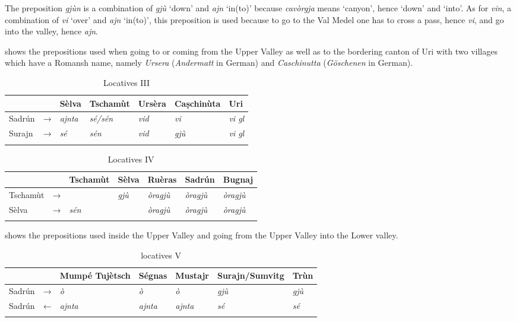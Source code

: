 The preposition \textit{gjùn} is a combination of \textit{gjù} `down' and \textit{ajn} `in(to)' because \textit{cavòrgja} means `canyon', hence `down' and `into'. As for \textit{vin}, a combination of \textit{vi} `over' and \textit{ajn} `in(to)', this preposition is used because to go to the Val Medel one has to cross a pass, hence \textit{vi}, and go into the valley, hence \textit{ajn}.

 shows the prepositions used when going to or coming from the Upper Valley as well as to the bordering canton of Uri with two villages which have a Romansh name, namely \textit{Ursera} (\textit{Andermatt} in German) and \textit{Caschinutta} (\textit{Göschenen} in German).

\begin{table}
	\caption{Locatives III}
	\label{loc3}
	\begin{tabular}{lllllll}
		\lsptoprule
		& & Sèlva & Tschamùt & Ursèra & Caṣchinùta & Uri\\ 
		\midrule
		Sadrún  & → & \textit{ajnta} & \textit{sé/sén} & \textit{vid} & \textit{vi} & \textit{vi gl}\\
		Surajn  & → & \textit{sé} & \textit{sén}  & \textit{vid} & \textit{gjù} & \textit{vi gl}\\
		\lspbottomrule
	\end{tabular}
\end{table}

\begin{table}
	\caption{Locatives IV}
	\label{loc4}
	\begin{tabular}{lllllll}
		\lsptoprule
		& & Tschamùt & Sèlva & Ruèras & Sadrún & Bugnaj\\
		\midrule
		Tschamùt  & → & \longrule  & \textit{gjù}  & \textit{òragjù}     & \textit{òragjù}  & \textit{òragjù}\\
		Sèlva  & → & \textit{sén} & \longrule & \textit{òragjù}  & \textit{òragjù}   & \textit{òragjù} \\
		\lspbottomrule
	\end{tabular}
\end{table}

 shows the prepositions used inside the Upper Valley and going from the Upper Valley into the Lower valley.


\begin{table}
	\caption{locatives V}
	\label{loc5}
	\begin{tabular}{lllllll}
		\lsptoprule
		&       & Mumpé Tujètsch & Ségnas & Mustajr & Surajn/Sumvitg & Trùn\\ 
		\midrule
		Sadrún  & →  & \textit{ò} & \textit{ò}  &    \textit{ò} & \textit{gjù} & \textit{gjù}\\
		Sadrún & ← & \textit{ajnta} & \textit{ajnta} & \textit{ajnta} & \textit{sé}  & \textit{sé} \\
		\lspbottomrule
	\end{tabular}
\end{table}

